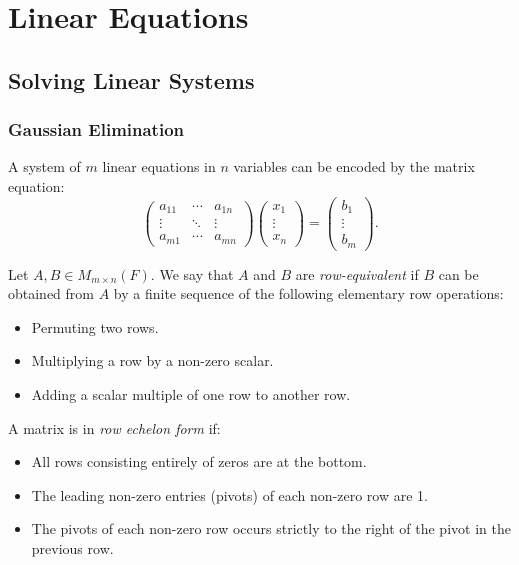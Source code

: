 \documentclass[../linear_algebra_and_groups.tex]{subfiles}
\begin{document}
\chapter{Linear Equations}


\section{Solving Linear Systems}

\subsection{Gaussian Elimination}

A system of $m$ linear equations in $n$ variables can be encoded by the matrix equation:
\[\begin{pmatrix}a_{11} & \cdots & a_{1n}\\\vdots & \ddots & \vdots \\ a_{m1} & \cdots & a_{mn}\end{pmatrix}\begin{pmatrix}x_1\\\vdots\\x_n\end{pmatrix}=\begin{pmatrix}b_1\\\vdots\\b_m\end{pmatrix}.\]

\begin{definition}
    \begin{shaded*}
        Let $A,B\in M_{m\times n}(F)$. We say that $A$ and $B$ are \textit{row-equivalent} if $B$ can be obtained from $A$ by a finite sequence of the following elementary row operations:
        \begin{itemize}
            \item Permuting two rows.
            \item Multiplying a row by a non-zero scalar.
            \item Adding a scalar multiple of one row to another row.
        \end{itemize}
    \end{shaded*}
\end{definition}

\begin{definition}
    \begin{shaded*}
        A matrix is in \textit{row echelon form} if:
        \begin{itemize}
            \item All rows consisting entirely of zeros are at the bottom.
            \item The leading non-zero entries (pivots) of each non-zero row are 1.
            \item The pivots of each non-zero row occurs strictly to the right of the pivot in the previous row.
        \end{itemize}
    \end{shaded*}
\end{definition}
\end{document}
